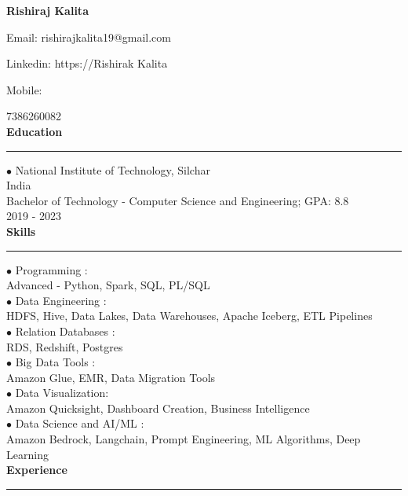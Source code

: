 \documentclass[11pt,a4paper]{article}
\renewcommand{\section}[1]{%
  \vspace{12pt}%
  {\large\bfseries #1}%
  \vspace{6pt}%
  \hrule%
  \vspace{6pt}%
}
\begin{document}
\begin{center}\Huge\textbf{Rishiraj Kalita}\\[0.5cm]\end{center}

\begin{center}Email: rishirajkalita19@gmail.com\end{center}
\begin{center}Linkedin: https://Rishirak Kalita\end{center}
\begin{center}Mobile:\end{center}
7386260082\\[0.2cm]
\section{Education}

\noindent $\bullet$ National Institute of Technology, Silchar\\[0.2cm]
India\\[0.2cm]
Bachelor of Technology - Computer Science and Engineering; GPA: 8.8\\[0.2cm]
2019 - 2023\\[0.2cm]
\section{Skills}

\noindent $\bullet$ Programming :\\[0.2cm]
Advanced - Python, Spark, SQL, PL/SQL\\[0.2cm]
\noindent $\bullet$ Data Engineering :\\[0.2cm]
HDFS, Hive, Data Lakes, Data Warehouses, Apache Iceberg, ETL Pipelines\\[0.2cm]
\noindent $\bullet$ Relation Databases :\\[0.2cm]
RDS, Redshift, Postgres\\[0.2cm]
\noindent $\bullet$ Big Data Tools :\\[0.2cm]
Amazon Glue, EMR, Data Migration Tools\\[0.2cm]
\noindent $\bullet$ Data Visualization:\\[0.2cm]
Amazon Quicksight, Dashboard Creation, Business Intelligence\\[0.2cm]
\noindent $\bullet$ Data Science and AI/ML :\\[0.2cm]
Amazon Bedrock, Langchain, Prompt Engineering, ML Algorithms, Deep Learning\\[0.2cm]
\section{Experience}
\end{document}

